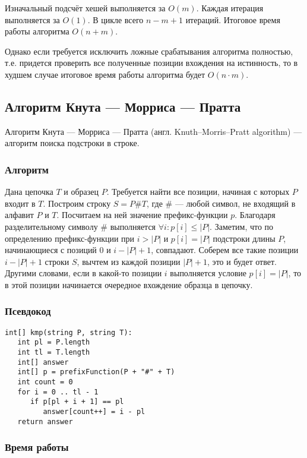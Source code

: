 Изначальный подсчёт хешей выполняется за $O(m)$.
Каждая итерация выполняется за $O(1)$.
В цикле всего $n-m+1$ итераций.
Итоговое время работы алгоритма $O(n+m)$.

Однако если требуется исключить ложные срабатывания алгоритма полностью, т.е. придется проверить все полученные позиции вхождения на истинность, то в худшем случае итоговое время работы алгоритма будет $O(n \cdot m)$.

\subsection{Алгоритм Кнута --- Морриса --- Пратта}

Алгоритм Кнута --- Морриса --- Пратта (англ. Knuth–Morris–Pratt algorithm) --- алгоритм поиска подстроки в строке.

\subsubsection{Алгоритм}

Дана цепочка $T$ и образец $P$.
Требуется найти все позиции, начиная с которых $P$ входит в $T$.
Построим строку $S=P\#T$, где $\#$ --- любой символ, не входящий в алфавит $P$ и $T$.
Посчитаем на ней значение префикс-функции $p$.
Благодаря разделительному символу $\#$ выполняется $\forall i:p[i] \le |P|$.
Заметим, что по определению префикс-функции при $i>|P|$ и $p[i]=|P|$ подстроки длины $P$, начинающиеся с позиций 0 и $i-|P|+1$, совпадают.
Соберем все такие позиции $i−|P|+1$ строки $S$, вычтем из каждой позиции $|P|+1$, это и будет ответ.
Другими словами, если в какой-то позиции $i$ выполняется условие $p[i]=|P|$, то в этой позиции начинается очередное вхождение образца в цепочку.

\subsubsection{Псевдокод}

\begin{verbatim}
int[] kmp(string P, string T):
   int pl = P.length
   int tl = T.length
   int[] answer
   int[] p = prefixFunction(P + "#" + T)
   int count = 0
   for i = 0 .. tl - 1
      if p[pl + i + 1] == pl
         answer[count++] = i - pl
   return answer
\end{verbatim}

\subsubsection{Время работы}

